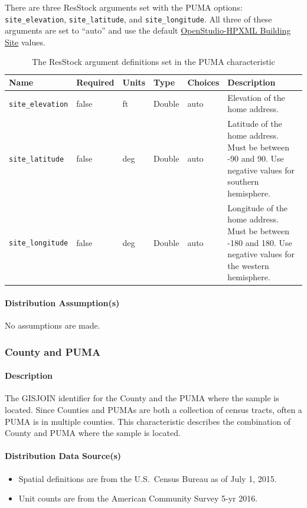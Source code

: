 There are three ResStock arguments set with the PUMA options: \texttt{site\_elevation}, \texttt{site\_latitude}, and \texttt{site\_longitude}. All three of these arguments are set to ``auto'' and use the default \href{https://openstudio-hpxml.readthedocs.io/en/v1.8.1/workflow_inputs.html#hpxml-building-site}{OpenStudio-HPXML Building Site} values.

\begin{longtable}[]{ |p{}|p{1.5cm}|p{1cm}|p{1.1cm}|p{1.4cm}|p{6cm}| }
\caption{The ResStock argument definitions set in the PUMA characteristic} \label{table:hc_arg_def_puma}  \\
\toprule\noalign{}
Name & Required & Units & Type & Choices & Description \\
\midrule\noalign{}
\endhead
\bottomrule\noalign{}
\endlastfoot
\texttt{site\_elevation} & false & ft & Double & auto & Elevation of the
home address.  \\
\hline
\texttt{site\_latitude} & false & deg & Double & auto & Latitude of the
home address. Must be between -90 and 90. Use negative values for
southern hemisphere.\\
\hline
\texttt{site\_longitude} & false & deg & Double & auto & Longitude of
the home address. Must be between -180 and 180. Use negative values for
the western hemisphere.\\
\end{longtable}

\paragraph{Distribution Assumption(s)}
No assumptions are made.

\subsubsection{County and PUMA}
\paragraph{Description}
The GISJOIN identifier for the County and the PUMA where the sample is located. Since Counties and PUMAs are both a collection of census tracts, often a PUMA is in multiple counties. This characteristic describes the combination of County and PUMA where the sample is located.

\paragraph{Distribution Data Source(s)}
\begin{itemize}
 
\item
  Spatial definitions are from the U.S.~Census Bureau as of July 1,
  2015.
\item
  Unit counts are from the American Community Survey 5-yr 2016.
\end{itemize}

